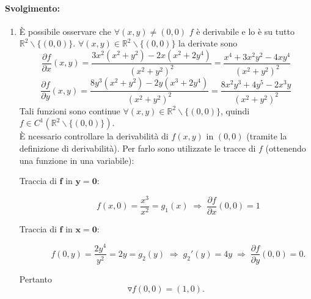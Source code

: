 \begin{example}
	\paragraph{Svolgimento:}
	\begin{enumerate}
		\item È possibile osservare che $\forall (x,y)\neq (0,0)$ $f$ è derivabile e lo è su tutto $\mathbb{R}^2\backslash\{(0,0)\}$. $\forall (x,y)\in\mathbb{R}^2\backslash\{(0,0)\}$ la derivate sono
		\begin{equation*}
			\frac{\partial f}{\partial x} (x,y) = \frac{3x^2(x^2+y^2)-2x(x^2+2y^4)}{(x^2+y^2)^2} = \frac{x^4 + 3x^2 y^2-4xy^4}{(x^2+y^2)^2}
		\end{equation*} 
		\begin{equation*}
			\frac{\partial f}{\partial y} (x,y) = \frac{8y^3(x^2+y^2)-2y(x^3+2y^4)}{(x^2+y^2)^2} = \frac{8x^2y^3 + 4y^5-2x^3y}{(x^2+y^2)^2}
		\end{equation*} 
		Tali funzioni sono continue $\forall (x,y) \in\mathbb{R}^2\backslash\{(0,0)\}$, quindi $f\in C^1(\mathbb{R}^2\backslash\{(0,0)\})$.\\
		È ncessario controllare la derivabilità di $f(x,y)$ in $(0,0)$ (tramite la definizione di derivabilità). Per farlo sono utilizzate le tracce di $f$ (ottenendo una funzione in una variabile):
		\begin{description}
			\item[Traccia di $\boldsymbol{f}$ in $\boldsymbol{y=0}$:]
			\begin{equation*}
				f(x,0) = \frac{x^3}{x^2}=g_1(x) \; \Rightarrow \; \frac{\partial f}{\partial x}(0,0) = 1 
			\end{equation*}
			\item[Traccia di $\boldsymbol{f}$ in $\boldsymbol{x=0}$:]
			\begin{equation*}
				f(0,y) = \frac{2y^4}{y^2} = 2 y = g_2(y) \; \Rightarrow \; g_2'(y)=4y \;\Rightarrow\; \frac{\partial f}{\partial y}(0,0) = 0.
			\end{equation*}
		\end{description}
		Pertanto
		\begin{equation*}
			\triangledown f(0,0)=(1,0).
		\end{equation*}
		

\end{enumerate}
\end{example}
